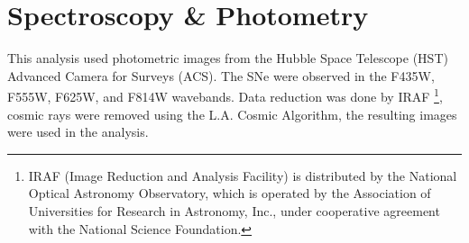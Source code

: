 \documentclass[preprint]{aastex}
\begin{document}



\section{Spectroscopy \& Photometry}

This analysis used photometric images from the Hubble Space Telescope (HST) 
Advanced Camera for Surveys (ACS).
The SNe were observed in the F435W, F555W, F625W, and F814W wavebands. 
Data reduction was done by IRAF \footnote{IRAF (Image Reduction and Analysis Facility)
 is distributed by the National
Optical Astronomy Observatory, which is operated by the Association
of Universities for Research in Astronomy, Inc., under cooperative agreement
with the National Science Foundation.},  cosmic rays were removed using the L.A. Cosmic Algorithm,
the resulting images were used in the analysis. 

\end{document}
